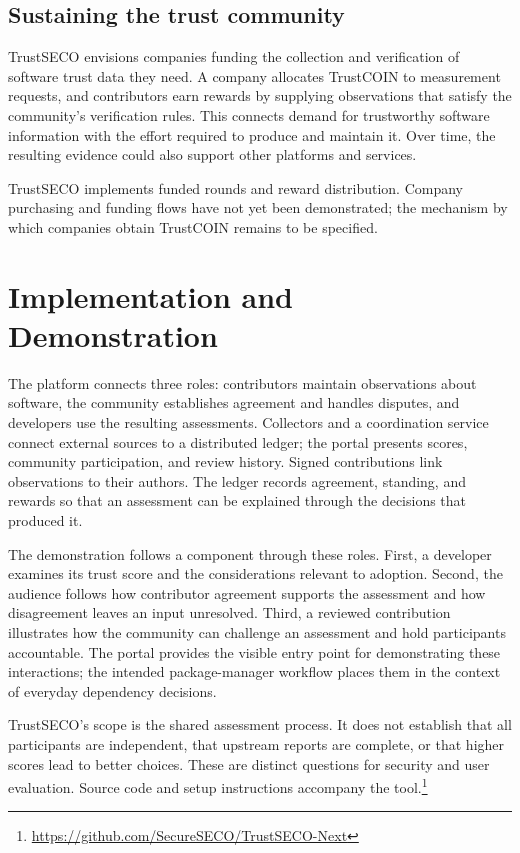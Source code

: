\documentclass[10pt,conference]{IEEEtran}
\begin{document}
\subsection{Sustaining the trust community}
TrustSECO envisions companies funding the collection and verification of software trust data they need. A company allocates TrustCOIN to measurement requests, and contributors earn rewards by supplying observations that satisfy the community's verification rules. This connects demand for trustworthy software information with the effort required to produce and maintain it. Over time, the resulting evidence could also support other platforms and services.

TrustSECO implements funded rounds and reward distribution. Company purchasing and funding flows have not yet been demonstrated; the mechanism by which companies obtain TrustCOIN remains to be specified.

\section{Implementation and Demonstration}
\label{sec:implementation}
The platform connects three roles: contributors maintain observations about software, the community establishes agreement and handles disputes, and developers use the resulting assessments. Collectors and a coordination service connect external sources to a distributed ledger; the portal presents scores, community participation, and review history. Signed contributions link observations to their authors. The ledger records agreement, standing, and rewards so that an assessment can be explained through the decisions that produced it.

The demonstration follows a component through these roles. First, a developer examines its trust score and the considerations relevant to adoption. Second, the audience follows how contributor agreement supports the assessment and how disagreement leaves an input unresolved. Third, a reviewed contribution illustrates how the community can challenge an assessment and hold participants accountable. The portal provides the visible entry point for demonstrating these interactions; the intended package-manager workflow places them in the context of everyday dependency decisions.

TrustSECO's scope is the shared assessment process. It does not establish that all participants are independent, that upstream reports are complete, or that higher scores lead to better choices. These are distinct questions for security and user evaluation. Source code and setup instructions accompany the tool.\footnote{\url{https://github.com/SecureSECO/TrustSECO-Next}}
\end{document}
